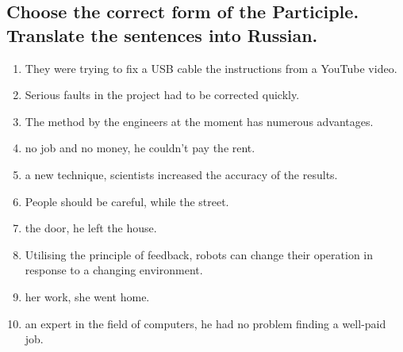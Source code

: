 \subsection*{Choose the correct form of the Participle. Translate the sentences into Russian.}
\begin{enumerate}
      \item They were trying to fix a USB cable \underline{\hspace{2cm}} the instructions from a YouTube video.
      \item Serious faults \underline{\hspace{2cm}} in the project had to be corrected quickly.
      \item The method \underline{\hspace{2cm}} by the engineers at the moment has numerous advantages.
      \item \underline{\hspace{2cm}} no job and no money, he couldn’t pay the rent.
      \item \underline{\hspace{2cm}} a new technique, scientists increased the accuracy of the results.
      \item People should be careful, while \underline{\hspace{2cm}} the street.
      \item \underline{\hspace{2cm}} the door, he left the house.
      \item Utilising the principle of feedback, robots can change their operation in response to a changing environment.
      \item \underline{\hspace{2cm}} her work, she went home.
      \item \underline{\hspace{2cm}} an expert in the field of computers, he had no problem finding a well-paid job.
\end{enumerate}


